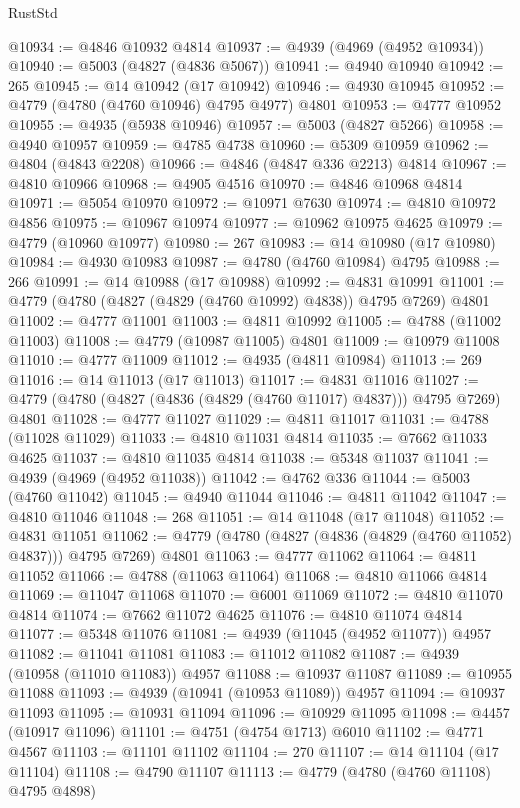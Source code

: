 \begin{lexlean}{RustStd}
\begin{coremodule}
@10934 := @4846 @10932 @4814
@10937 := @4939 (@4969 (@4952 @10934))
@10940 := @5003 (@4827 (@4836 @5067))
@10941 := @4940 @10940
@10942 := 265
@10945 := @14 @10942 (@17 @10942)
@10946 := @4930 @10945
@10952 := @4779 (@4780 (@4760 @10946) @4795 @4977) @4801
@10953 := @4777 @10952
@10955 := @4935 (@5938 @10946)
@10957 := @5003 (@4827 @5266)
@10958 := @4940 @10957
@10959 := @4785 @4738
@10960 := @5309 @10959
@10962 := @4804 (@4843 @2208)
@10966 := @4846 (@4847 @336 @2213) @4814
@10967 := @4810 @10966
@10968 := @4905 @4516
@10970 := @4846 @10968 @4814
@10971 := @5054 @10970
@10972 := @10971 @7630
@10974 := @4810 @10972 @4856
@10975 := @10967 @10974
@10977 := @10962 @10975 @4625
@10979 := @4779 (@10960 @10977)
@10980 := 267
@10983 := @14 @10980 (@17 @10980)
@10984 := @4930 @10983
@10987 := @4780 (@4760 @10984) @4795
@10988 := 266
@10991 := @14 @10988 (@17 @10988)
@10992 := @4831 @10991
@11001 := @4779 (@4780 (@4827 (@4829 (@4760 @10992) @4838)) @4795 @7269) @4801
@11002 := @4777 @11001
@11003 := @4811 @10992
@11005 := @4788 (@11002 @11003)
@11008 := @4779 (@10987 @11005) @4801
@11009 := @10979 @11008
@11010 := @4777 @11009
@11012 := @4935 (@4811 @10984)
@11013 := 269
@11016 := @14 @11013 (@17 @11013)
@11017 := @4831 @11016
@11027 := @4779 (@4780 (@4827 (@4836 (@4829 (@4760 @11017) @4837))) @4795 @7269) @4801
@11028 := @4777 @11027
@11029 := @4811 @11017
@11031 := @4788 (@11028 @11029)
@11033 := @4810 @11031 @4814
@11035 := @7662 @11033 @4625
@11037 := @4810 @11035 @4814
@11038 := @5348 @11037
@11041 := @4939 (@4969 (@4952 @11038))
@11042 := @4762 @336
@11044 := @5003 (@4760 @11042)
@11045 := @4940 @11044
@11046 := @4811 @11042
@11047 := @4810 @11046
@11048 := 268
@11051 := @14 @11048 (@17 @11048)
@11052 := @4831 @11051
@11062 := @4779 (@4780 (@4827 (@4836 (@4829 (@4760 @11052) @4837))) @4795 @7269) @4801
@11063 := @4777 @11062
@11064 := @4811 @11052
@11066 := @4788 (@11063 @11064)
@11068 := @4810 @11066 @4814
@11069 := @11047 @11068
@11070 := @6001 @11069
@11072 := @4810 @11070 @4814
@11074 := @7662 @11072 @4625
@11076 := @4810 @11074 @4814
@11077 := @5348 @11076
@11081 := @4939 (@11045 (@4952 @11077)) @4957
@11082 := @11041 @11081
@11083 := @11012 @11082
@11087 := @4939 (@10958 (@11010 @11083)) @4957
@11088 := @10937 @11087
@11089 := @10955 @11088
@11093 := @4939 (@10941 (@10953 @11089)) @4957
@11094 := @10937 @11093
@11095 := @10931 @11094
@11096 := @10929 @11095
@11098 := @4457 (@10917 @11096)
@11101 := @4751 (@4754 @1713) @6010
@11102 := @4771 @4567
@11103 := @11101 @11102
@11104 := 270
@11107 := @14 @11104 (@17 @11104)
@11108 := @4790 @11107
@11113 := @4779 (@4780 (@4760 @11108) @4795 @4898)

\end{coremodule}
\end{lexlean}
